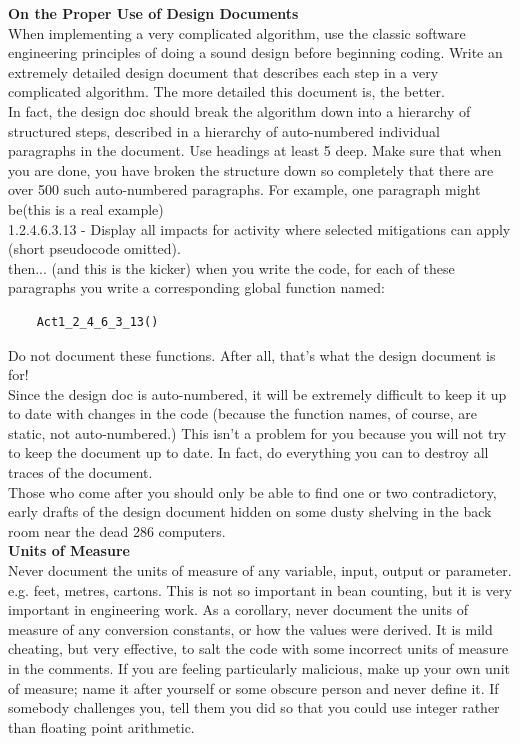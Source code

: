 \documentclass[11pt,twoside,a4paper]{article}
\begin{document}
\textbf{On the Proper Use of Design Documents}~\\
When implementing a very complicated algorithm, use the classic software engineering principles of doing a sound design before beginning coding. Write an extremely detailed design document that describes each step in a very complicated algorithm. The more detailed this document is, the better.~\\
 
In fact, the design doc should break the algorithm down into a hierarchy of structured steps, described in a hierarchy of auto-numbered individual paragraphs in the document. Use headings at least 5 deep. Make sure that when you are done, you have broken the structure down so completely that there are over 500 such auto-numbered paragraphs. For example, one paragraph might be(this is a real example)~\\ 

1.2.4.6.3.13 - Display all impacts for activity where selected mitigations can apply (short pseudocode omitted).~\\ 

then... (and this is the kicker) when you write the code, for each of these paragraphs you write a corresponding global function named:~\\ 
\begin{verbatim}
	Act1_2_4_6_3_13()
\end{verbatim} 
Do not document these functions. After all, that's what the design document is for!~\\
 
Since the design doc is auto-numbered, it will be extremely difficult to keep it up to date with changes in the code (because the function names, of course, are static, not auto-numbered.) This isn't a problem for you because you will not try to keep the document up to date. In fact, do everything you can to destroy all traces of the document.~\\ 

Those who come after you should only be able to find one or two contradictory, early drafts of the design document hidden on some dusty shelving in the back room near the dead 286 computers.~\\ 

\textbf{Units of Measure}~\\
Never document the units of measure of any variable, input, output or parameter. e.g. feet, metres, cartons. This is not so important in bean counting, but it is very important in engineering work. As a corollary, never document the units of measure of any conversion constants, or how the values were derived. It is mild cheating, but very effective, to salt the code with some incorrect units of measure in the comments. If you are feeling particularly malicious, make up your own unit of measure; name it after yourself or some obscure person and never define it. If somebody challenges you, tell them you did so that you could use integer rather than floating point arithmetic.~\\ 
\end{document}
